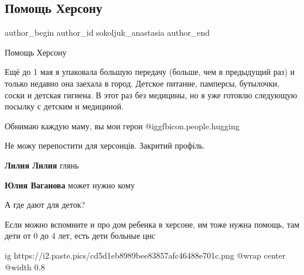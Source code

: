  
 
 
 
 
 
\subsection{Помощь Херсону}
\label{sec:07_05_2022.fb.sokoljuk_anastasia.1.pomosch_hersonu}
 
\ifcmt
 author_begin
   author_id sokoljuk_anastasia
 author_end
\fi

Помощь Херсону

Ещё до 1 мая я упаковала большую передачу (больше, чем в предыдущий раз) и
только недавно она заехала в город. Детское питание, памперсы, бутылочки, соски
и детская гигиена. В этот раз без медицины, но я уже готовлю следующую посылку
с детским и медициной. 


Обнимаю каждую маму, вы мои герои @igg{fbicon.people.hugging}


\begin{itemize} %
Не можу перепостити для херсонців. Закритий профіль.

\textbf{Лилия Лилия} глянь

\textbf{Юлия Ваганова} может нужно кому

А где дают для деток?


Если можно вспомните и про дом ребенка в херсоне, им тоже нужна помощь, там
дети от 0 до 4 лет, есть дети больные цнс
\end{itemize} %

\ifcmt
  ig https://i2.paste.pics/cd5d1eb8989bee83857afc46488e701c.png
  @wrap center
  @width 0.8
\fi
